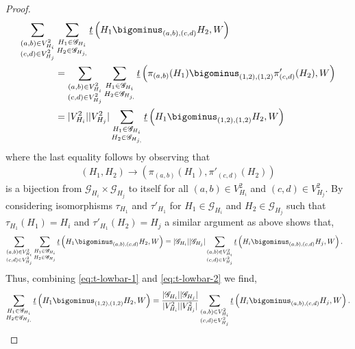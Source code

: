 \documentclass[11pt,reqno]{amsart}
\numberwithin{equation}{section}
\theoremstyle{definition}
\begin{document}
\begin{proof}
\begin{align}\label{eq:t-lowbar-1}
    \sum_{\substack{(a,b)\in V_{H_{i}}^{2}\\(c,d)\in V_{H_{j}}^{2}}}
    &\sum_{\substack{H_{1}\in\mathscr{G}_{H_{i}}\\ H_{2}\in\mathscr{G}_{H_{j,}}}}\underline{t}\left(H_{1}\bigominus_{(a,b),(c,d)}H_{2},W\right) \nonumber\\
    &= \sum_{\substack{(a,b)\in V_{H_{i}}^{2}\\(c,d)\in V_{H_{j}}^{2}}}\sum_{\substack{H_{1}\in\mathscr{G}_{H_{i}}\\ H_{2}\in\mathscr{G}_{H_{j,}}}}\underline{t}\left(\pi_{(a, b)}(H_{1})\bigominus_{(1,2),(1,2)}\pi'_{(c, d)}(H_{2}),W\right)\nonumber\\
    &= |V_{H_{i}}^{2}||V_{H_{j}}^{2}|\sum_{\substack{H_{1}\in\mathscr{G}_{H_{i}}\\ H_{2}\in\mathscr{G}_{H_{j,}}}}\underline{t}\left(H_{1}\bigominus_{(1,2),(1,2)}H_{2},W\right)
\end{align}
where the last equality follows by observing that 
\begin{align*}
    \left(H_{1},H_{2}\right)\rightarrow\left(\pi_{(a, b)}(H_{1}),\pi'_{(c, d)}(H_{2})\right)
\end{align*}
is a bijection from $\mathscr{G}_{H_{i}}\times \mathscr{G}_{H_{j}}$ to itself for all $(a,b)\in V_{H_{i}}^{2}$ and $(c,d)\in V_{H_{j}}^{2}$. By considering isomorphisms $\tau_{H_{1}}$ and $\tau'_{H_{1}}$ for $H_{1}\in\mathscr{G}_{H_{i}}$ and $H_{2}\in\mathscr{G}_{H_{j}}$ such that $\tau_{H_{1}}(H_{1}) = H_{i}$ and $\tau'_{H_{1}}(H_{2}) = H_{j}$ a similar argument as above shows that,
\begin{align}\label{eq:t-lowbar-2}
    \sum_{\substack{(a,b)\in V_{H_{i}}^{2}\\(c,d)\in V_{H_{j}}^{2}}}
    \sum_{\substack{H_{1}\in\mathscr{G}_{H_{i}}\\ H_{2}\in\mathscr{G}_{H_{j}}}}\underline{t}\left(H_{1}\bigominus_{(a,b),(c,d)}H_{2},W\right)
    & = |\mathscr{G}_{H_{i}}||\mathscr{G}_{H_{j}}|\sum_{\substack{(a,b)\in V_{H_{i}}^{2}\\(c,d)\in V_{H_{j}}^{2}}}\underline{t}\left(H_{i}\bigominus_{(a,b),(c,d)}H_{j},W\right) . 
\end{align}
Thus, combining \eqref{eq:t-lowbar-1} and \eqref{eq:t-lowbar-2} we find,
\begin{align}\label{eq:t-lowbar-minus}
    \sum_{\substack{H_{1}\in\mathscr{G}_{H_{i}}\\ H_{2}\in\mathscr{G}_{H_{j,}}}}\underline{t}\left(H_{1}\bigominus_{(1,2),(1,2)}H_{2},W\right) = \dfrac{|\mathscr{G}_{H_{i}}||\mathscr{G}_{H_{j}}|}{|V_{H_{i}}^{2}||V_{H_{j}}^{2}|}\sum_{\substack{(a,b)\in V_{H_{i}}^{2}\\(c,d)\in V_{H_{j}}^{2}}}\underline{t}\left(H_{i}\bigominus_{(a,b),(c,d)}H_{j},W\right) . 

\end{align}
\end{proof}
\end{document}
